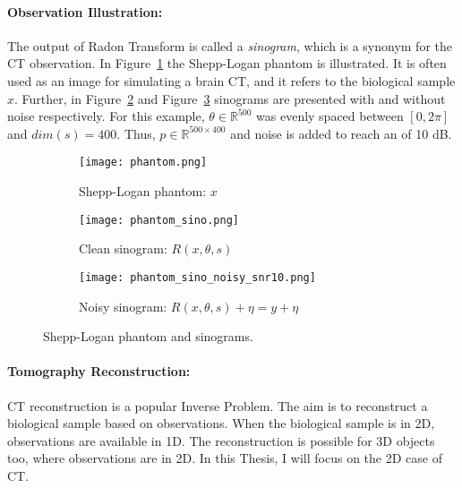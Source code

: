 \paragraph{Observation Illustration:}

The output of Radon Transform is called a \textit{sinogram}, which is a synonym for the CT observation.
In Figure~\ref{fig:phantom} the Shepp-Logan phantom is illustrated.
It is often used as an image for simulating a brain CT, and it refers to the biological sample $x$. 
Further, in Figure~\ref{fig:phantom_sinogram} and Figure~\ref{fig:phantom_sinogram_noisy} 
sinograms are presented with and without noise respectively. 
For this example, $\theta \in \mathbb{R}^{500}$ was evenly spaced
between $[0, 2 \pi]$ and $dim(s) = 400$. 
Thus, $p \in \mathbb{R}^{500 \times 400}$ and noise is added to reach an \snry of 10 dB.

\begin{figure}[H]
    \captionsetup[subfigure]{justification=centering}
    \centering
    \begin{subfigure}[t]{0.3\textwidth}
        \texttt{[image: phantom.png]}
        \caption{Shepp-Logan phantom: $x$}
        \label{fig:phantom}
    \end{subfigure}\hfill
    \begin{subfigure}[t]{0.3\textwidth}
      \texttt{[image: phantom\_sino.png]}
      \caption{Clean sinogram: $R(x, \theta, s)$}
      \label{fig:phantom_sinogram}
    \end{subfigure}\hfill
    \begin{subfigure}[t]{0.3\textwidth}
      \texttt{[image: phantom\_sino\_noisy\_snr10.png]}
      \caption{Noisy sinogram: $R(x, \theta, s) + \eta = y + \eta$}
      \label{fig:phantom_sinogram_noisy}
    \end{subfigure}
    \caption{Shepp-Logan phantom and sinograms.}
    \label{fig:phantom_and_sinos}
  \end{figure}


\paragraph{Tomography Reconstruction:}

CT reconstruction is a popular Inverse Problem. 
The aim is to reconstruct a biological sample based on observations.
When the biological sample is in 2D, observations are available in 1D. 
The reconstruction is possible for 3D objects too, where observations are in 2D.
In this Thesis, I will focus on the 2D case of CT.


